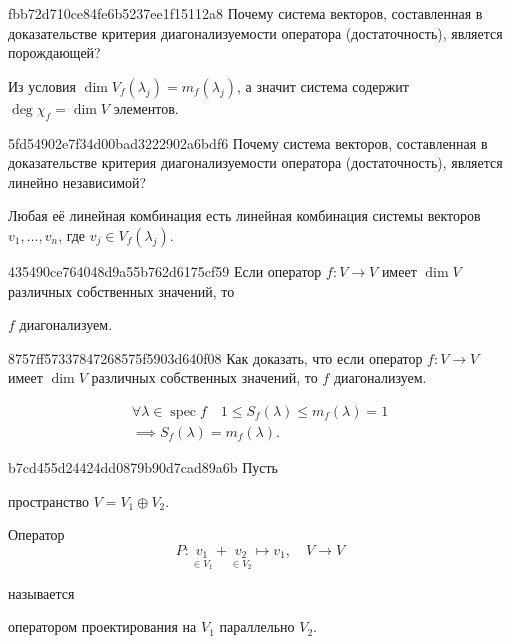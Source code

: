 \begin{note}{fbb72d710ce84fe6b5237ee1f15112a8}
    Почему система векторов, составленная в доказательстве критерия диагонализуемости оператора (достаточность), является порождающей?

    \begin{cloze}{1}
        Из условия \( \dim V_f (\lambda_j) = m_f (\lambda_j) \), а значит система содержит \( \deg \chi_f = \dim V \) элементов.
    \end{cloze}
\end{note}

\begin{note}{5fd54902e7f34d00bad3222902a6bdf6}
    Почему система векторов, составленная в доказательстве критерия диагонализуемости оператора (достаточность), является линейно независимой?

    \begin{cloze}{1}
        Любая её линейная комбинация есть линейная комбинация системы векторов \( v_1, \ldots, v_n \), где \( v_j \in V_f (\lambda_j) \).
    \end{cloze}
\end{note}

\begin{note}{435490ce764048d9a55b762d6175cf59}
    Если оператор \( f : V  \to V \) имеет \( \dim V \) различных собственных значений, то \begin{icloze}{1}\( f \) диагонализуем.\end{icloze}
\end{note}

\begin{note}{8757ff57337847268575f5903d640f08}
    Как доказать, что если оператор \( f : V \to V \) имеет \( \dim V \) различных собственных значений, то \( f \) диагонализуем.

    \begin{cloze}{1}
        \begin{multline*}
            \forall \lambda \in \operatorname{spec} f \quad 1 \leqslant S_f(\lambda) \leqslant m_f(\lambda) = 1 \\
            \implies  S_f (\lambda) = m_f (\lambda).
        \end{multline*}
    \end{cloze}
\end{note}

\begin{note}{b7cd455d24424dd0879b90d7cad89a6b}
    Пусть \begin{icloze}{3}пространство \( V = V_1 \oplus V_2 \).\end{icloze}
    \begin{icloze}{1}Оператор
    \[
        P : \underset{\in V_1}{v_1} + \underset{\in V_2}{v_2} \mapsto v_1, \quad V \to V
    \]
    \end{icloze} называется \begin{icloze}{2}оператором проектирования на \( V_1 \) параллельно \( V_2 \).\end{icloze}
\end{note}

